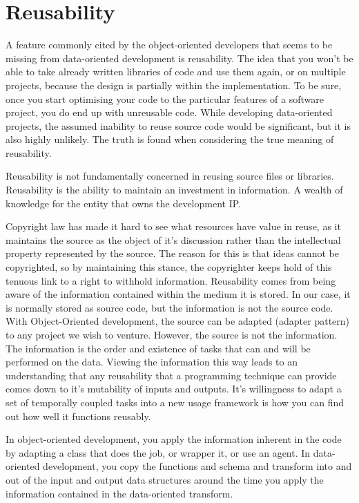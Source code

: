 \section{Reusability}

A feature commonly cited by the object-oriented developers that seems to be
missing from data-oriented development is reusability. The idea that you won't
be able to take already written libraries of code and use them again, or on
multiple projects, because the design is partially within the implementation.
To be sure, once you start optimising your code to the particular features of a
software project, you do end up with unreusable code. While developing
data-oriented projects, the assumed inability to reuse source code would be
significant, but it is also highly unlikely. The truth is found when
considering the true meaning of reusability.

Reusability is not fundamentally concerned in reusing source files or
libraries. Reusability is the ability to maintain an investment in information.
A wealth of knowledge for the entity that owns the development IP.

Copyright law has made it hard to see what resources have value in reuse, as it
maintains the source as the object of it's discussion rather than the
intellectual property represented by the source. The reason for this is that
ideas cannot be copyrighted, so by maintaining this stance, the copyrighter
keeps hold of this tenuous link to a right to withhold information. Reusability
comes from being aware of the information contained within the medium it is
stored. In our case, it is normally stored as source code, but the information
is not the source code. With Object-Oriented development, the source can be
adapted (adapter pattern) to any project we wish to venture. However, the
source is not the information. The information is the order and existence of
tasks that can and will be performed on the data. Viewing the information this
way leads to an understanding that any reusability that a programming technique
can provide comes down to it's mutability of inputs and outputs. It's
willingness to adapt a set of temporally coupled tasks into a new usage
framework is how you can find out how well it functions reusably.

In object-oriented development, you apply the information inherent in the code
by adapting a class that does the job, or wrapper it, or use an agent. In
data-oriented development, you copy the functions and schema and transform into
and out of the input and output data structures around the time you apply the
information contained in the data-oriented transform.

